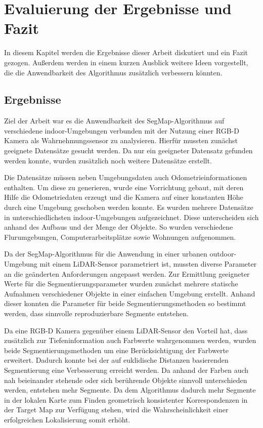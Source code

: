 \chapter[Künstliche neuronale Netze (Kopp, Schmelzer)]{Evaluierung der Ergebnisse und Fazit}

In diesem Kapitel werden die Ergebnisse dieser Arbeit diskutiert und ein Fazit gezogen. Außerdem werden in einem kurzen Ausblick weitere Ideen vorgestellt, die die Anwendbarkeit des Algorithmus zusätzlich verbessern könnten. 

\section[Ergebnisse (Kopp, Schmelzer)]{Ergebnisse} 

Ziel der Arbeit war es die Anwendbarkeit des SegMap-Algorithmus auf verschiedene indoor-Umgebungen verbunden mit der Nutzung einer RGB-D Kamera als \linebreak Wahrnehmungssensor zu analysieren. Hierfür mussten zunächst geeignete Datensätze gesucht werden. Da nur ein geeigneter Datensatz gefunden werden konnte, wurden zusätzlich noch weitere Datensätze erstellt. 

Die Datensätze müssen neben Umgebungsdaten auch Odometrieinformationen enthalten. Um diese zu generieren, wurde eine Vorrichtung gebaut, mit deren Hilfe die Odometriedaten erzeugt und die Kamera auf einer konstanten Höhe durch eine Umgebung geschoben werden konnte. Es wurden mehrere Datensätze in unterschiedlichsten indoor-Umgebungen aufgezeichnet. Diese unterscheiden sich anhand des Aufbaus und der Menge der Objekte. So wurden verschiedene Flurumgebungen, Computerarbeitsplätze sowie Wohnungen aufgenommen. 

Da der SegMap-Algorithmus für die Anwendung in einer urbanen outdoor-Umgebung mit einem LiDAR-Sensor parametriert ist, mussten diverse Parameter an die geänderten Anforderungen angepasst werden. Zur Ermittlung geeigneter Werte für die Segmentierungsparameter wurden zunächst mehrere statische Aufnahmen verschiedener Objekte in einer einfachen Umgebung erstellt. Anhand dieser konnten die Parameter für beide Segmentierungsmethoden so bestimmt werden, dass sinnvolle reproduzierbare Segmente entstehen. 

Da eine RGB-D Kamera gegenüber einem LiDAR-Sensor den Vorteil hat, dass zusätzlich zur Tiefeninformation auch Farbwerte wahrgenommen werden, wurden beide Segmentierungsmethoden um eine Berücksichtigung der Farbwerte erweitert. \linebreak Dadurch konnte bei der auf euklidische Distanzen basierenden Segmentierung eine Verbesserung erreicht werden. Da anhand der Farben auch nah beieinander stehende oder sich berührende Objekte sinnvoll unterschieden werden, entstehen mehr Segmente. Da dem Algorithmus dadurch mehr Segmente in der lokalen Karte zum Finden geometrisch konsistenter Korrespondenzen in der Target Map zur Verfügung stehen, wird die Wahrscheinlichkeit einer erfolgreichen Lokalisierung somit erhöht. 

